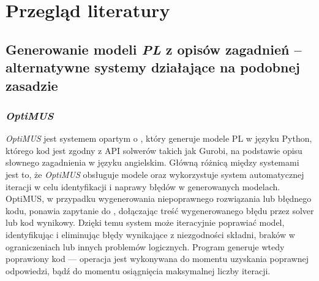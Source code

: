 
\chapter{Przegląd literatury}\label{ch:review}


\section{Generowanie modeli \textit{PL} z opisów zagadnień -- \newline alternatywne systemy działające na podobnej zasadzie}
\subsection*{\textit{OptiMUS}\cite{ahmaditeshnizi2023optimus}}\label{sec:optimus}
\textit{OptiMUS} jest systemem opartym o , który generuje modele PL w języku Python, którego kod jest zgodny z API solwerów takich jak Gurobi\cite{gurobi2023}, na podstawie opisu słownego zagadnienia w języku angielskim.
Główną różnicą między systemami jest to, że \textit{OptiMUS} obsługuje modele  oraz wykorzystuje system automatycznej iteracji w celu identyfikacji i naprawy błędów w generowanych modelach.
OptiMUS, w przypadku wygenerowania niepoprawnego rozwiązania lub błędnego kodu, ponawia zapytanie do , dołączając treść wygenerowanego błędu przez solver lub kod wynikowy. Dzięki temu system może iteracyjnie poprawiać model, identyfikując i eliminując błędy wynikające z niezgodności składni, braków w ograniczeniach lub innych problemów logicznych.
Program generuje wtedy poprawiony kod --- operacja jest wykonywana do momentu uzyskania poprawnej odpowiedzi, bądź do momentu osiągnięcia maksymalnej liczby iteracji.

